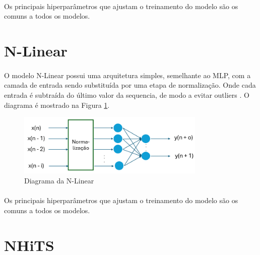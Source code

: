 \paragraph{} Os principais hiperparâmetros que ajustam o treinamento do modelo são os comuns a todos os modelos.

\section{\acf{N-Linear}}

\paragraph{} O modelo \ac{N-Linear} possui uma arquitetura simples, semelhante ao \ac{MLP}, com a camada de entrada sendo substituída por uma etapa de normalização. Onde cada entrada é subtraída do último valor da sequencia, de modo a evitar outliers \cite{DLinear22}. O diagrama é mostrado na Figura \ref{fig:nlinear_diagram}.

\begin{figure}
	\begin{center}
		\begin{center}
			\includegraphics[width=0.8\textwidth]{figuras/nlinear_diagram.png}
			\caption{Diagrama da \acs{N-Linear}}
			\label{fig:nlinear_diagram}
		\end{center}

	\end{center}
\end{figure}

\paragraph{} Os principais hiperparâmetros que ajustam o treinamento do modelo são os comuns a todos os modelos.

\section{\acf{NHiTS}}

